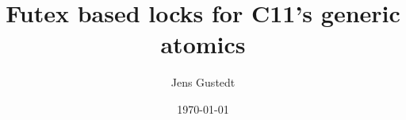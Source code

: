 \documentclass{sig-alternate-05-2015}
\author{Jens Gustedt\\
\affaddr{INRIA and ICube, Universit\'{e} de Strasbourg, France}}
\date{\today}
\title{Futex based locks for C11's generic atomics}
\let\tableofcontents=\relax
\begin{document}
\maketitle
\tableofcontents


\begin{abstract}

\end{abstract}






\end{document}
